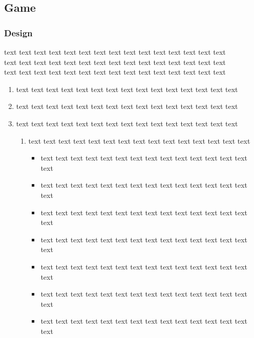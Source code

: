 \documentclass[12pt]{report}
\begin{document}
\subsection*{Game}
\subsubsection{Design}
text text text text text text text text text text text text text text text\\text text text text text text text text text text text text text text text\\text text text text text text text text text text text text text text text\\
\begin{enumerate}
\item text text text text text text text text text text text text text text text\\
\item text text text text text text text text text text text text text text text\\
\item text text text text text text text text text text text text text text text\\
\begin{enumerate}
\item text text text text text text text text text text text text text text text\\
\begin{itemize}
\item text text text text text text text text text text text text text text text\\
\item text text text text text text text text text text text text text text text\\
\item text text text text text text text text text text text text text text text\\
\item text text text text text text text text text text text text text text text\\
\item text text text text text text text text text text text text text text text\\
\item text text text text text text text text text text text text text text text\\
\item text text text text text text text text text text text text text text text\\

\end{itemize}
\end{enumerate}
\end{enumerate}
\end{document}
